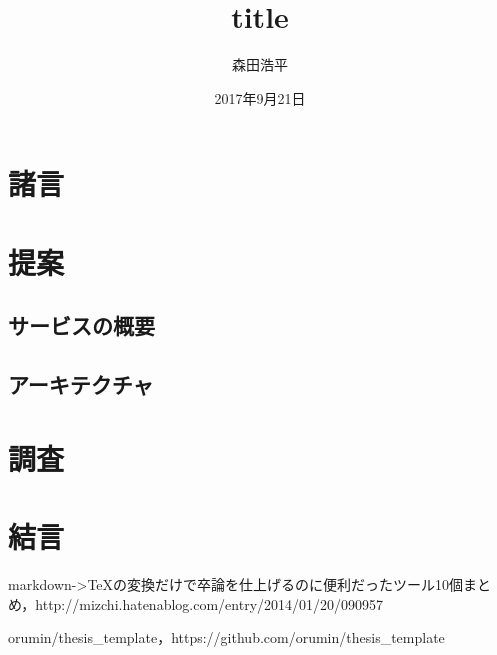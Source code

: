 \documentclass[shinchoku]{hitsotsuron} %
\title{title}
\author{森田浩平}
\date{2017年9月21日}
\begin{document}

\twocolumn[%
\maketitle
]

\section{諸言}



\section{提案}



\subsection{サービスの概要}


\subsection{アーキテクチャ}


\section{調査}


\section{結言}


\begin{thebibliography}{1}

markdown->TeXの変換だけで卒論を仕上げるのに便利だったツール10個まとめ，http://mizchi.hatenablog.com/entry/2014/01/20/090957

orumin/thesis\_template，https://github.com/orumin/thesis\_template

\end{thebibliography}
\end{document}

